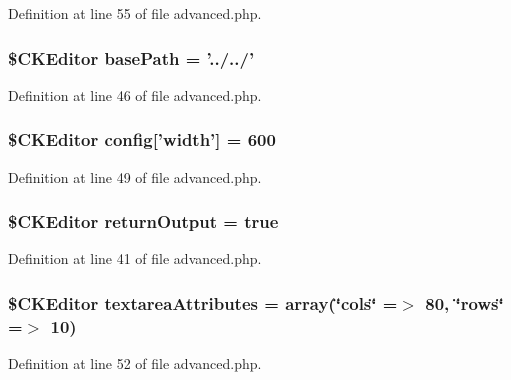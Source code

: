 Definition at line 55 of file advanced.php.

\hypertarget{advanced_8php_a94a267f018012b013582daafb6a89618}{
\subsubsection[{basePath}]{\setlength{\rightskip}{0pt plus 5cm}\${\bf CKEditor} {\bf basePath} = '../../'}}
\label{advanced_8php_a94a267f018012b013582daafb6a89618}


Definition at line 46 of file advanced.php.

\hypertarget{advanced_8php_a3f176ffce3afa63656bfc989470e3e24}{
\subsubsection[{config}]{\setlength{\rightskip}{0pt plus 5cm}\${\bf CKEditor} {\bf config}\mbox{[}'width'\mbox{]} = 600}}
\label{advanced_8php_a3f176ffce3afa63656bfc989470e3e24}


Definition at line 49 of file advanced.php.

\hypertarget{advanced_8php_a124ae4ee461e572dc24e6be964499bf0}{
\subsubsection[{returnOutput}]{\setlength{\rightskip}{0pt plus 5cm}\${\bf CKEditor} {\bf returnOutput} = true}}
\label{advanced_8php_a124ae4ee461e572dc24e6be964499bf0}


Definition at line 41 of file advanced.php.

\hypertarget{advanced_8php_a661a342adc5c319c4cb41b8447768048}{
\subsubsection[{textareaAttributes}]{\setlength{\rightskip}{0pt plus 5cm}\${\bf CKEditor} {\bf textareaAttributes} = {\bf array}(\char`\"{}cols\char`\"{} =$>$ 80, \char`\"{}rows\char`\"{} =$>$ 10)}}
\label{advanced_8php_a661a342adc5c319c4cb41b8447768048}


Definition at line 52 of file advanced.php.

